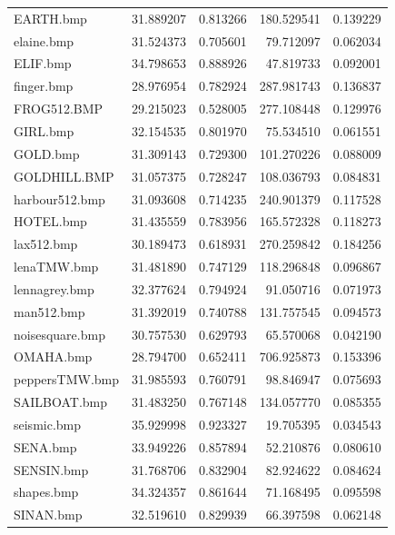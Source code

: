 \documentclass{article}
\begin{document}
\begin{table}[!ht]
\begin{tabular}{@{}lrrrr@{}}
    EARTH.bmp          & 31.889207     & 0.813266 & 180.529541 & 0.139229 \\
    elaine.bmp         & 31.524373     & 0.705601 & 79.712097  & 0.062034 \\
    ELIF.bmp           & 34.798653     & 0.888926 & 47.819733  & 0.092001 \\
    finger.bmp         & 28.976954     & 0.782924 & 287.981743 & 0.136837 \\
    FROG512.BMP        & 29.215023     & 0.528005 & 277.108448 & 0.129976 \\
    GIRL.bmp           & 32.154535     & 0.801970 & 75.534510  & 0.061551 \\
    GOLD.bmp           & 31.309143     & 0.729300 & 101.270226 & 0.088009 \\
    GOLDHILL.BMP       & 31.057375     & 0.728247 & 108.036793 & 0.084831 \\
    harbour512.bmp     & 31.093608     & 0.714235 & 240.901379 & 0.117528 \\
    HOTEL.bmp          & 31.435559     & 0.783956 & 165.572328 & 0.118273 \\
    lax512.bmp         & 30.189473     & 0.618931 & 270.259842 & 0.184256 \\
    lenaTMW.bmp        & 31.481890     & 0.747129 & 118.296848 & 0.096867 \\
    lennagrey.bmp      & 32.377624     & 0.794924 & 91.050716  & 0.071973 \\
    man512.bmp         & 31.392019     & 0.740788 & 131.757545 & 0.094573 \\
    noisesquare.bmp    & 30.757530     & 0.629793 & 65.570068  & 0.042190 \\
    OMAHA.bmp          & 28.794700     & 0.652411 & 706.925873 & 0.153396 \\
    peppersTMW.bmp     & 31.985593     & 0.760791 & 98.846947  & 0.075693 \\
    SAILBOAT.bmp       & 31.483250     & 0.767148 & 134.057770 & 0.085355 \\
    seismic.bmp        & 35.929998     & 0.923327 & 19.705395  & 0.034543 \\
    SENA.bmp           & 33.949226     & 0.857894 & 52.210876  & 0.080610 \\
    SENSIN.bmp         & 31.768706     & 0.832904 & 82.924622  & 0.084624 \\
    shapes.bmp         & 34.324357     & 0.861644 & 71.168495  & 0.095598 \\
    SINAN.bmp          & 32.519610     & 0.829939 & 66.397598  & 0.062148 \\

\end{tabular}
\end{table}
\end{document}
